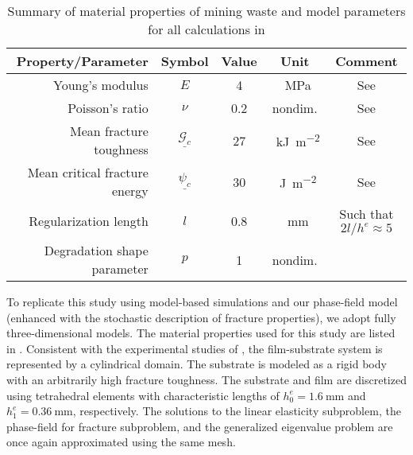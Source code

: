 \begin{table}[htb!]
  \centering
  \caption{Summary of material properties of mining waste and model parameters for all calculations in }
  \begin{tabular}{r c c c c}
    \toprule
    Property/Parameter            & Symbol                      & Value & Unit                                & Comment                                                     \\
    \midrule
    Young's modulus               & $E$                         & 4     & \SI{}{\mega\pascal}                 & See \cite{sanchez2014modeling}                              \\
    Poisson's ratio               & $\nu$                       & 0.2   & nondim.                             & See \cite{sanchez2014modeling}                              \\
    Mean fracture toughness       & $\underline{\mathcal{G}_c}$ & 27    & \SI{}{\kilo\joule\per\square\meter} & See \cite{rodriguez2007experimental,lakshmikantha2009image} \\[5pt]
    Mean critical fracture energy & $\underline{\psi_c}$        & 30    & \SI{}{\joule\per\square\meter}      & See \cite{rodriguez2007experimental,lakshmikantha2009image} \\[5pt]
    Regularization length         & $l$                         & 0.8   & \SI{}{\milli\meter}                 & Such that $2l/h^e \approx 5$                                \\
    Degradation shape parameter   & $p$                         & 1     & nondim.                             &                                                             \\
    \bottomrule
  \end{tabular}
  \label{tab: MW}
\end{table}



To replicate this study using model-based simulations and our phase-field model (enhanced with the stochastic description of fracture properties), we adopt fully three-dimensional models.  The material properties used for this study are  listed in .  Consistent with the experimental studies of \cite{Rodriguez2006}, the film-substrate system is represented by a cylindrical domain. The substrate is modeled as a rigid body with an arbitrarily high fracture toughness. The substrate and film are discretized using tetrahedral elements with characteristic lengths of $h^e_0 = \SI{1.6}{\milli\meter}$ and $h^e_1 = \SI{0.36}{\milli\meter}$, respectively. The solutions to the linear elasticity subproblem, the phase-field for fracture subproblem, and the generalized eigenvalue problem are once again approximated using the same mesh.

